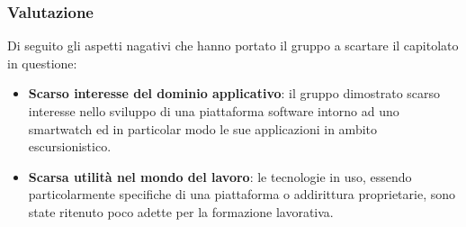 \subsubsection{Valutazione}
Di seguito gli aspetti nagativi che hanno portato il gruppo a scartare il capitolato in questione:
\begin{itemize}
\item \textbf{Scarso interesse del dominio applicativo}: il gruppo dimostrato scarso interesse nello sviluppo di una piattaforma software intorno ad uno smartwatch ed in particolar modo le sue applicazioni in ambito escursionistico.
\item \textbf{Scarsa utilità nel mondo del lavoro}: le tecnologie in uso, essendo particolarmente specifiche di una piattaforma o addirittura proprietarie, sono state ritenuto poco adette per la formazione lavorativa.
\end{itemize}